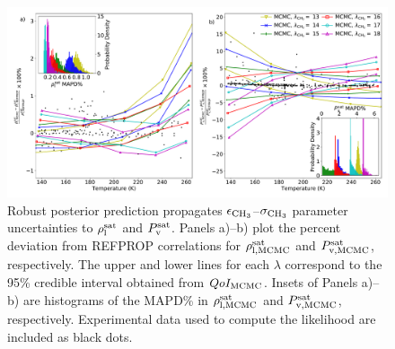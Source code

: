 \documentclass[preprint,letterpaper,floatfix,citeautoscript,aip,jcp]{revtex4-1}
\begin{document}
\begin{figure}[htb!]
	\centering
	\includegraphics[width=6.4in]{MCMC_ethane_VLE}
	\caption{Robust posterior prediction propagates $\epsilon_{\rm CH_3}$--$\sigma_{\rm CH_3}$ parameter uncertainties to $\rho_{\rm l}^{\rm sat}$ and $P_{\rm v}^{\rm sat}$. Panels a)--b) plot the percent deviation from REFPROP correlations for $\rho_{\rm l, MCMC}^{\rm sat}$ and $P_{\rm v, MCMC}^{\rm sat}$, respectively. The upper and lower lines for each $\lambda$ correspond to the 95\% credible interval obtained from $QoI_{\rm MCMC}$. Insets of Panels a)--b) are histograms of the MAPD\% in $\rho_{\rm l, MCMC}^{\rm sat}$ and $P_{\rm v, MCMC}^{\rm sat}$, respectively. Experimental data used to compute the likelihood are included as black dots.}
	\label{fig:MCMC_ethane_VLE}
\end{figure}
\end{document}
